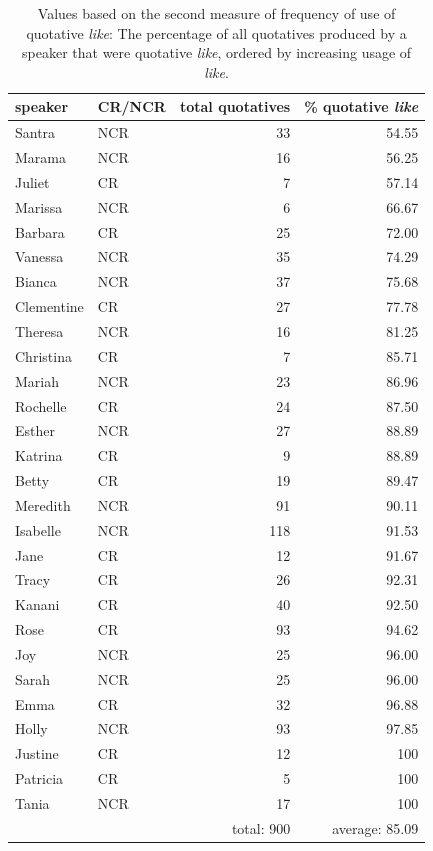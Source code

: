 \begin{table}[htbp]
\caption{Values based on the second measure of frequency of use of quotative \textit{like}: The percentage of all quotatives produced by a speaker that were quotative \textit{like}, ordered by increasing usage of \textit{like}.}
  \label{tab:percentlike}
	 \begin{center}
		\begin{tabular}{llrr}\hline
	
speaker & CR/NCR & total quotatives & \% quotative \textit{like}\\
  \hline
Santra &	NCR &	33	& 54.55 \\
Marama &	NCR	& 16	& 56.25 \\
Juliet &	CR	& 7	& 57.14 \\
Marissa	& NCR	& 6	& 66.67 \\
Barbara	& CR	& 25	& 72.00 \\
Vanessa	& NCR	& 35	& 74.29 \\
Bianca	& NCR	& 37	& 75.68 \\
Clementine	& CR	& 27	& 77.78 \\
Theresa	& NCR	& 16	& 81.25 \\
Christina	& CR	& 7	& 85.71 \\
Mariah	& NCR	& 23	& 86.96 \\
Rochelle	& CR	& 24	& 87.50 \\
Esther	& NCR	& 27	& 88.89 \\
Katrina	& CR	& 9	& 88.89 \\
Betty	& CR	& 19	& 89.47 \\
Meredith	& NCR	& 91	& 90.11 \\
Isabelle	& NCR	& 118	& 91.53 \\
Jane	& CR	& 12	& 91.67 \\
Tracy	& CR	& 26	& 92.31 \\
Kanani	& CR	& 40	& 92.50 \\
Rose &	CR	& 93	& 94.62 \\
Joy	& NCR	& 25	& 96.00 \\
Sarah	& NCR	& 25	& 96.00 \\
Emma &	CR	& 32	& 96.88 \\
Holly	& NCR	& 93	& 97.85 \\
Justine	& CR	& 12	& 100 \\
Patricia	& CR	& 5	& 100 \\
Tania	& NCR	& 17	& 100 \\
& & total: 900	& average: 85.09 \\

\hline
		\end{tabular}
	
	\end{center}
\end{table} 

